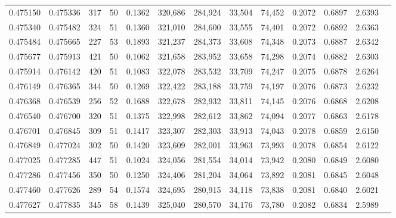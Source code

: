 \begin{tabular}{rrrrrrrrrrrrr}
0.475150 & 0.475336 &   317 &  50 &                                     0.1362 & 320,686 & 284,924 &  33,504 &  74,452 & 0.2072 & 0.6897 & 2.6393 \\
0.475340 & 0.475482 &   324 &  51 &                                     0.1360 & 321,010 & 284,600 &  33,555 &  74,401 & 0.2072 & 0.6892 & 2.6363 \\
0.475484 & 0.475665 &   227 &  53 &                                     0.1893 & 321,237 & 284,373 &  33,608 &  74,348 & 0.2073 & 0.6887 & 2.6342 \\
0.475677 & 0.475913 &   421 &  50 &                                     0.1062 & 321,658 & 283,952 &  33,658 &  74,298 & 0.2074 & 0.6882 & 2.6303 \\
0.475914 & 0.476142 &   420 &  51 &                                     0.1083 & 322,078 & 283,532 &  33,709 &  74,247 & 0.2075 & 0.6878 & 2.6264 \\
0.476149 & 0.476365 &   344 &  50 &                                     0.1269 & 322,422 & 283,188 &  33,759 &  74,197 & 0.2076 & 0.6873 & 2.6232 \\
0.476368 & 0.476539 &   256 &  52 &                                     0.1688 & 322,678 & 282,932 &  33,811 &  74,145 & 0.2076 & 0.6868 & 2.6208 \\
0.476540 & 0.476700 &   320 &  51 &                                     0.1375 & 322,998 & 282,612 &  33,862 &  74,094 & 0.2077 & 0.6863 & 2.6178 \\
0.476701 & 0.476845 &   309 &  51 &                                     0.1417 & 323,307 & 282,303 &  33,913 &  74,043 & 0.2078 & 0.6859 & 2.6150 \\
0.476849 & 0.477024 &   302 &  50 &                                     0.1420 & 323,609 & 282,001 &  33,963 &  73,993 & 0.2078 & 0.6854 & 2.6122 \\
0.477025 & 0.477285 &   447 &  51 &                                     0.1024 & 324,056 & 281,554 &  34,014 &  73,942 & 0.2080 & 0.6849 & 2.6080 \\
0.477286 & 0.477456 &   350 &  50 &                                     0.1250 & 324,406 & 281,204 &  34,064 &  73,892 & 0.2081 & 0.6845 & 2.6048 \\
0.477460 & 0.477626 &   289 &  54 &                                     0.1574 & 324,695 & 280,915 &  34,118 &  73,838 & 0.2081 & 0.6840 & 2.6021 \\
0.477627 & 0.477835 &   345 &  58 &                                     0.1439 & 325,040 & 280,570 &  34,176 &  73,780 & 0.2082 & 0.6834 & 2.5989 \\

\end{tabular}

